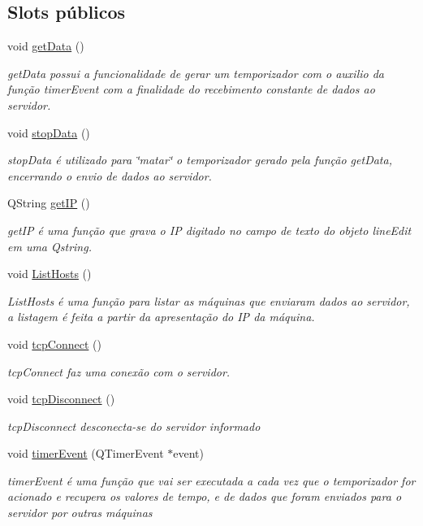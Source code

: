 \subsection*{Slots públicos}
\begin{DoxyCompactItemize}
\item 
void \hyperlink{class_main_window_a4a2ddf4cf2ec8e240cc340416b1df792}{get\+Data} ()
\begin{DoxyCompactList}\small\item\em get\+Data possui a funcionalidade de gerar um temporizador com o auxilio da função timer\+Event com a finalidade do recebimento constante de dados ao servidor. \end{DoxyCompactList}\item 
void \hyperlink{class_main_window_a79fdaf1fd769f0584f50da34e415b3de}{stop\+Data} ()
\begin{DoxyCompactList}\small\item\em stop\+Data é utilizado para \char`\"{}matar\char`\"{} o temporizador gerado pela função get\+Data, encerrando o envio de dados ao servidor. \end{DoxyCompactList}\item 
Q\+String \hyperlink{class_main_window_a2bf0fb2c40fb08b96f95f65d9ee1c979}{get\+IP} ()
\begin{DoxyCompactList}\small\item\em get\+IP é uma função que grava o IP digitado no campo de texto do objeto line\+Edit em uma Qstring. \end{DoxyCompactList}\item 
void \hyperlink{class_main_window_aa1b929ac26c3c547b2904e88b7f70284}{List\+Hosts} ()
\begin{DoxyCompactList}\small\item\em List\+Hosts é uma função para listar as máquinas que enviaram dados ao servidor, a listagem é feita a partir da apresentação do IP da máquina. \end{DoxyCompactList}\item 
void \hyperlink{class_main_window_ac5b669957c442b6eb68573dacfce33e1}{tcp\+Connect} ()
\begin{DoxyCompactList}\small\item\em tcp\+Connect faz uma conexão com o servidor. \end{DoxyCompactList}\item 
void \hyperlink{class_main_window_a4d22c4c7afc7ba0a2fa4c70515c85dda}{tcp\+Disconnect} ()
\begin{DoxyCompactList}\small\item\em tcp\+Disconnect desconecta-\/se do servidor informado \end{DoxyCompactList}\item 
void \hyperlink{class_main_window_aaa425b1554af3c1f58cc70b4815082ae}{timer\+Event} (Q\+Timer\+Event $\ast$event)
\begin{DoxyCompactList}\small\item\em timer\+Event é uma função que vai ser executada a cada vez que o temporizador for acionado e recupera os valores de tempo, e de dados que foram enviados para o servidor por outras máquinas \end{DoxyCompactList}\end{DoxyCompactItemize}
